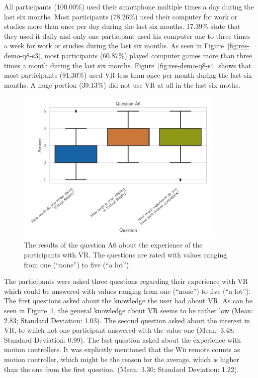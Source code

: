 All participants (100.00\%) used their smartphone multiple times a day during the last six months. Most participants (78.26\%) used their computer for work or studies more than once per day during the last six months. 17.39\% state that they used it daily and only one participant used his computer one to three times a week for work or studies during the last six months. As seen in Figure~\ref{fig:res-demo-q8-s3}, most participants (60.87\%) played computer games more than three times a month during the last six months. Figure~\ref{fig:res-demo-q8-s4} shows that most participants (91.30\%) used \ac{VR} less than once per month during the last six months. A huge portion (39.13\%) did not use \ac{VR} at all in the last six moths.

\begin{figure}[H]
  \centering
  \includegraphics[width=10cm]{figures/evaluation/res_demo_q9.pdf}
  \caption[VR experience of the participants]{The results of the question A6 about the experience of the participants with \ac{VR}. The questions are rated with values ranging from one (\enquote{none}) to five (\enquote{a lot}).}\label{fig:res-demo-q9}
\end{figure}

The participants were asked three questions regarding their experience with \ac{VR} which could be answered with values ranging from one (\enquote{none}) to five (\enquote{a lot}). The first questions asked about the knowledge the user had about \ac{VR}. As can be seen in Figure~\ref{fig:res-demo-q9}, the general knowledge about \ac{VR} seems to be rather low (Mean: 2.83; Standard Deviation: 1.03). The second question asked about the interest in \ac{VR}, to which not one participant answered with the value one (Mean: 3.48; Standard Deviation: 0.99). The last question asked about the experience with motion controllers. It was explicitly mentioned that the Wii remote counts as motion controller, which might be the reason for the average, which is higher than the one from the first question. (Mean: 3.30; Standard Deviation: 1.22).


